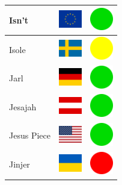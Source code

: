 \documentclass[12pt, a4paper, twoside]{report}
\begin{document}
\begin{center}
\begin{longtable}{|p{5cm}|p{2cm}|p{2cm}|}
 Isn't                                                      & \includegraphics[width=1cm]{../4x3/eu} &   \includegraphics[width=1cm]{../likes/y} \\ \hline
 Isole                                                      & \includegraphics[width=1cm]{../4x3/se} &   \includegraphics[width=1cm]{../likes/m} \\ \hline
 Jarl                                                       & \includegraphics[width=1cm]{../4x3/de} &   \includegraphics[width=1cm]{../likes/y} \\ \hline
 Jesajah                                                    & \includegraphics[width=1cm]{../4x3/at} &   \includegraphics[width=1cm]{../likes/y} \\ \hline
 Jesus Piece                                                & \includegraphics[width=1cm]{../4x3/us} &   \includegraphics[width=1cm]{../likes/y} \\ \hline
 Jinjer                                                     & \includegraphics[width=1cm]{../4x3/ua} &   \includegraphics[width=1cm]{../likes/n} \\ \hline

\end{longtable}
\end{center}
\end{document}
